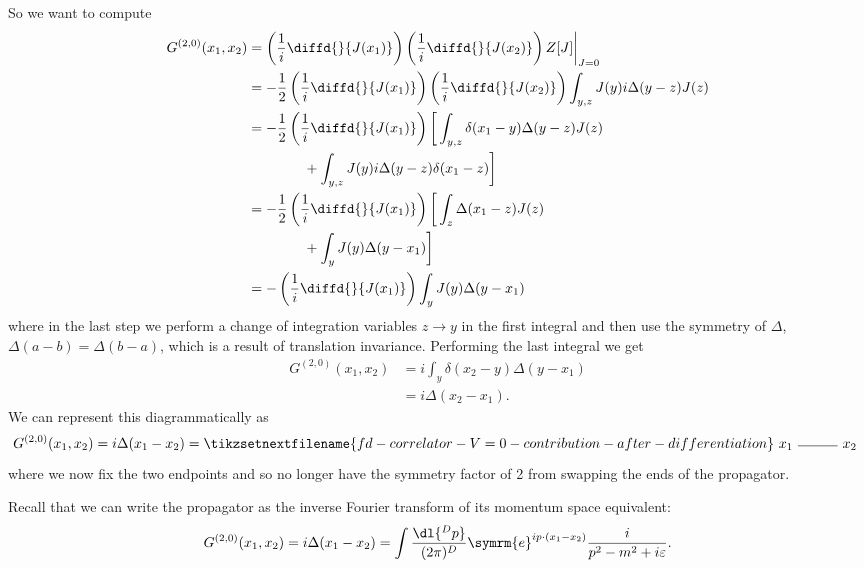 \documentclass[fleqn]{NotesClass}
\newcommand{\e}{\symrm{e}}
\begin{document}
    So we want to compute
    \begin{align}
        G^{(2, 0)}(x_1, x_2) &= \left( \frac{1}{i} \diffd{}{J(x_1)} \right) \left( \frac{1}{i} \diffd{}{J(x_2)} \right) Z[J] \bigg|_{J = 0}\\
        &= -\frac{1}{2} \left( \frac{1}{i} \diffd{}{J(x_1)} \right) \left( \frac{1}{i} \diffd{}{J(x_2)} \right) \int_{y,z} J(y) i\Delta(y - z) J(z)\\
        &= -\frac{1}{2} \left( \frac{1}{i} \diffd{}{J(x_1)} \right) \bigg[ \int_{y,z} \delta(x_1 - y) \Delta(y - z) J(z)\\
        &\qquad\qquad + \int_{y,z} J(y) i\Delta(y - z)\delta(x_1 - z) \bigg]\\
        &= -\frac{1}{2} \left( \frac{1}{i} \diffd{}{J(x_1)} \right) \bigg[ \int_z \Delta(x_1 - z)J(z)\\
        &\qquad\qquad+ \int_y J(y)\Delta(y - x_1) \bigg]\\
        &= -\left( \frac{1}{i} \diffd{}{J(x_1)} \right) \int_y J(y) \Delta(y - x_1)
    \end{align}
    where in the last step we perform a change of integration variables \(z \to y\) in the first integral and then use the symmetry of \(\Delta\), \(\Delta(a - b) = \Delta(b - a)\), which is a result of translation invariance.
    Performing the last integral we get
    \begin{align}
        G^{(2, 0)}(x_1, x_2) &= i \int_y \delta(x_2 - y) \Delta(y - x_1)\\
        &= i \Delta(x_2 - x_1).
    \end{align}
    We can represent this diagrammatically as
    \begin{equation}
        G^{(2, 0)}(x_1, x_2) = i\Delta(x_1 - x_2) = 
        \tikzsetnextfilename{fd-correlator-V=0-contribution-after-differentiation}
        \begin{tikzpicture}[baseline=(x.base)]
            \draw (0, 0) node[left] (x) {\(x_1\)} -- (1, 0) node[right] {\(x_2\)};
        \end{tikzpicture}
    \end{equation}
    where we now fix the two endpoints and so no longer have the symmetry factor of 2 from swapping the ends of the propagator.
    
    Recall that we can write the propagator as the inverse Fourier transform of its momentum space equivalent:
    \begin{equation}
        G^{(2, 0)}(x_1, x_2) = i\Delta(x_1 - x_2) = \int \frac{\dl{^Dp}}{(2\pi)^D} \e^{ip\cdot (x_1 - x_2)} \frac{i}{p^2 - m^2 + i\varepsilon}.
    \end{equation}
    
\end{document}
